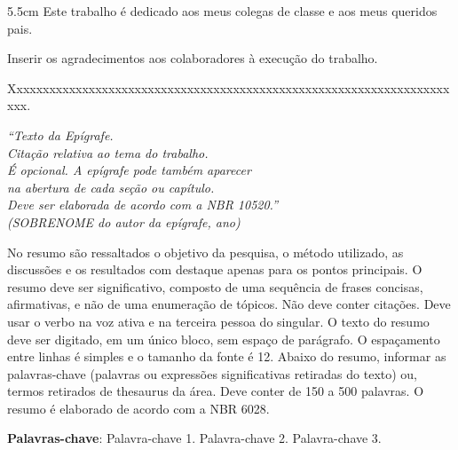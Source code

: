 
\begin{dedicatoria}
	\vspace*{\fill}
	\noindent
	\begin{adjustwidth*}{}{5.5cm} 
		\raggedleft       
		Este trabalho é dedicado aos meus colegas de classe e aos meus queridos pais.
	\end{adjustwidth*}
\end{dedicatoria}

\begin{agradecimentos}
	Inserir os agradecimentos aos colaboradores à execução do trabalho. 
	
	Xxxxxxxxxxxxxxxxxxxxxxxxxxxxxxxxxxxxxxxxxxxxxxxxxxxxxxxxxxxxxxxxxxxxxx. 
\end{agradecimentos}

\begin{epigrafe}
	\vspace*{\fill}
	\begin{flushright}
		\textit{``Texto da Epígrafe.\\
			Citação relativa ao tema do trabalho.\\
			É opcional. A epígrafe pode também aparecer\\
			na abertura de cada seção ou capítulo.\\
			Deve ser elaborada de acordo com a NBR 10520.''\\
			(SOBRENOME do autor da epígrafe, ano)}
	\end{flushright}
\end{epigrafe}


\setlength{\absparsep}{18pt} %
\begin{resumo}
	\SingleSpacing
	No resumo são ressaltados o objetivo da pesquisa, o método utilizado, as discussões e os resultados com destaque apenas para os pontos principais. O resumo deve ser significativo, composto de uma sequência de frases concisas, afirmativas, e não de uma enumeração de tópicos. Não deve conter citações. Deve usar o verbo na voz ativa e na terceira pessoa do singular. O texto do resumo deve ser digitado, em um único bloco, sem espaço de parágrafo. O espaçamento entre linhas é simples e o tamanho da fonte é 12. Abaixo do resumo, informar as palavras-chave (palavras ou expressões significativas retiradas do texto) ou, termos retirados de thesaurus da área. Deve conter de 150 a 500 palavras. O resumo é elaborado de acordo com a NBR 6028.
	
	\textbf{Palavras-chave}: Palavra-chave 1. Palavra-chave 2. Palavra-chave 3.
\end{resumo}

